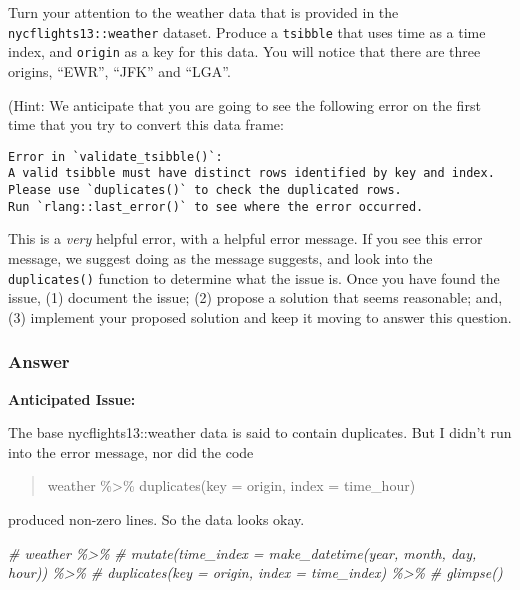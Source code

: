 \documentclass[
]{article}
\newenvironment{Shaded}{\begin{snugshade}}{\end{snugshade}}
\newcommand{\CommentTok}[1]{\textcolor[rgb]{0.56,0.35,0.01}{\textit{#1}}}
\begin{document}
Turn your attention to the weather data that is provided in the
\texttt{nycflights13::weather} dataset. Produce a \texttt{tsibble} that
uses time as a time index, and \texttt{origin} as a key for this data.
You will notice that there are three origins, ``EWR'', ``JFK'' and
``LGA''.

(Hint: We anticipate that you are going to see the following error on
the first time that you try to convert this data frame:

\begin{verbatim}
Error in `validate_tsibble()`:
A valid tsibble must have distinct rows identified by key and index.
Please use `duplicates()` to check the duplicated rows.
Run `rlang::last_error()` to see where the error occurred.
\end{verbatim}

This is a \emph{very} helpful error, with a helpful error message. If
you see this error message, we suggest doing as the message suggests,
and look into the \texttt{duplicates()} function to determine what the
issue is. Once you have found the issue, (1) document the issue; (2)
propose a solution that seems reasonable; and, (3) implement your
proposed solution and keep it moving to answer this question.

\subsubsection{Answer}\label{answer-3}

\textbf{Anticipated Issue:}

The base nycflights13::weather data is said to contain duplicates. But I
didn't run into the error message, nor did the code

\begin{quote}
weather \%\textgreater\% duplicates(key = origin, index = time\_hour)
\end{quote}

produced non-zero lines. So the data looks okay.

\begin{Shaded}
\begin{Highlighting}[]
\CommentTok{\# weather \%\textgreater{}\%}
\CommentTok{\#   mutate(time\_index = make\_datetime(year, month, day, hour)) \%\textgreater{}\%}
\CommentTok{\#   duplicates(key = origin, index = time\_index) \%\textgreater{}\%}
\CommentTok{\#   glimpse()}
\end{Highlighting}
\end{Shaded}
\end{document}
